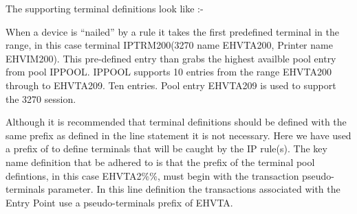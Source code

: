 \documentclass[letterpaper,10pt,english]{sphinxmanual}
\begin{document}
\begin{sphinxVerbatim}[commandchars=\\\{\}]
         
 
     
    
    
         
 
     
    
    
\end{sphinxVerbatim}

The supporting terminal definitions look like :-


When a device is “nailed” by a rule it takes the first predefined terminal in the range, in this case terminal IPTRM200(3270 name EHVTA200, Printer name EHVIM200). This pre-defined entry than grabs the highest availble pool entry from pool IPPOOL. IPPOOL supports 10 entries from the range EHVTA200 through to EHVTA209. Ten entries. Pool entry EHVTA209 is used to support the 3270 session.

Although it is recommended that terminal definitions should be defined with the same prefix as defined in the line statement it is not necessary. Here we have used a prefix of  to define terminals that will be caught by the IP rule(s). The key name definition that  be adhered to is that the prefix of the terminal pool defintions, in this case EHVTA2\%\%, must begin with the transaction pseudo-terminals parameter. In this line definition the transactions associated with the Entry Point use a pseudo-terminals prefix of EHVTA.
\end{document}
